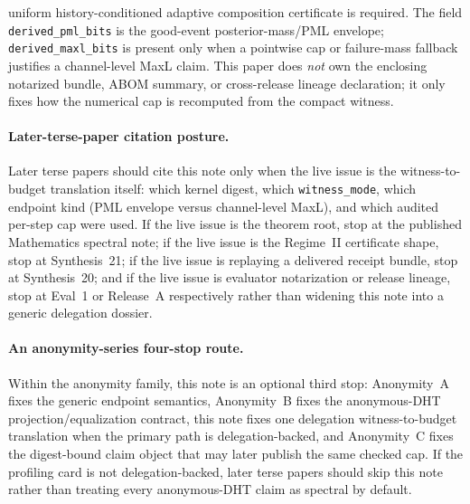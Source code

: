 \documentclass[11pt]{article}
\begin{document}
uniform history-conditioned adaptive composition certificate is required. The field \texttt{derived\_pml\_bits} is the good-event posterior-mass/PML envelope; \texttt{derived\_maxl\_bits} is present only when a pointwise cap or failure-mass fallback justifies a channel-level MaxL claim.
This paper does \emph{not} own the enclosing notarized bundle, ABOM summary, or cross-release lineage declaration; it only fixes how the numerical cap is recomputed from the compact witness.\cite{series:notcert,series:abomoinl,series:releaseA}

\paragraph{Later-terse-paper citation posture.}
Later terse papers should cite this note only when the live issue is the witness-to-budget translation itself: which kernel digest, which \texttt{witness\_mode}, which endpoint kind (PML envelope versus channel-level MaxL), and which audited per-step cap were used. If the live issue is the theorem root, stop at the published Mathematics spectral note; if the live issue is the Regime~II certificate shape, stop at Synthesis~21; if the live issue is replaying a delivered receipt bundle, stop at Synthesis~20; and if the live issue is evaluator notarization or release lineage, stop at Eval~1 or Release~A respectively rather than widening this note into a generic delegation dossier.\cite{series:spectral,series:condcert,series:auditorreplay,series:notcert,series:releaseA}

\paragraph{An anonymity-series four-stop route.}
Within the anonymity family, this note is an optional third stop: Anonymity~A fixes the generic endpoint semantics, Anonymity~B fixes the anonymous-DHT projection/equalization contract, this note fixes one delegation witness-to-budget translation when the primary path is delegation-backed, and Anonymity~C fixes the digest-bound claim object that may later publish the same checked cap. If the profiling card is not delegation-backed, later terse papers should skip this note rather than treating every anonymous-DHT claim as spectral by default.\cite{series:oddsinflation,series:profiling,series:abomoinl}
\end{document}
